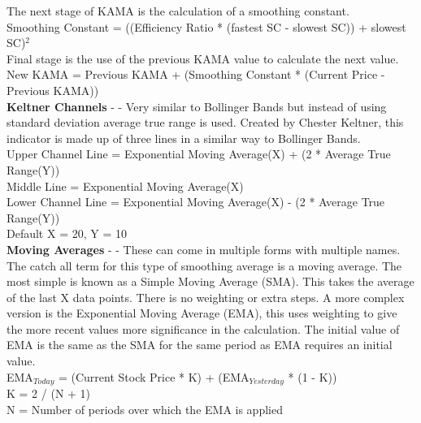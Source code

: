 \documentclass[conference]{IEEEtran}
\begin{document}
\noindent
The next stage of KAMA is the calculation of a smoothing constant. \\

\noindent
Smoothing Constant = ((Efficiency Ratio * (fastest SC - slowest SC)) + slowest SC)$^2$\\

\noindent
Final stage is the use of the previous KAMA value to calculate the next value. \\

\noindent
New KAMA = Previous KAMA + (Smoothing Constant * (Current Price - Previous KAMA))\\

\noindent
\textbf{Keltner Channels} - \cite{Keltner1960} - Very similar to Bollinger Bands but instead of using standard deviation average true range is used. Created by Chester Keltner, this indicator is made up of three lines in a similar way to Bollinger Bands.\\

\noindent
Upper Channel Line = Exponential Moving Average(X) + (2 * Average True Range(Y))\\
Middle Line = Exponential Moving Average(X)\\
Lower Channel Line = Exponential Moving Average(X) - (2 * Average True Range(Y))\\ Default X = 20, Y = 10 \\

\noindent
\textbf{Moving Averages} - \cite{Murphy1999} - These can come in multiple forms with multiple names. The catch all term for this type of smoothing average is a moving average. The most simple is known as a Simple Moving Average (SMA). This takes the average of the last X data points. There is no weighting or extra steps. A more complex version is the Exponential Moving Average (EMA), this uses weighting to give the more recent values more significance in the calculation. The initial value of EMA is the same as the SMA for the same period as EMA requires an initial value.\\

\noindent
EMA$_{Today}$ = (Current Stock Price * K) + (EMA$_{Yesterday}$ * (1 - K)) \\
K = 2 / (N + 1) \\
N = Number of periods over which the EMA is applied \\

\end{document}
